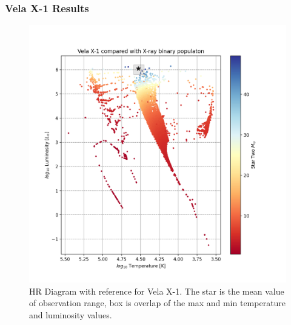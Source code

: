 \documentclass[12pt, a4paper]{article}
\begin{document}
            \subsubsection{Vela X-1 Results} \label{VelaX1Results}
            \begin{figure}[H] 
                \centering
                \includegraphics[scale = .5]{figs/GeneratedFigs/VelaX-1/VelaX1XrBPopulationHRComp.png}
                \caption{HR Diagram with reference for Vela X-1. The star is the mean value of observation range, box is overlap of the max and min temperature and luminosity values.}
                \label{VelaX1XrBPopulationHRComp}
            \end{figure}
\end{document}
